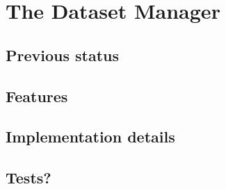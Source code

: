 \chapter{The Dataset Manager}

\section{Previous status}

\section{Features}

\section{Implementation details}

\section{Tests?}
